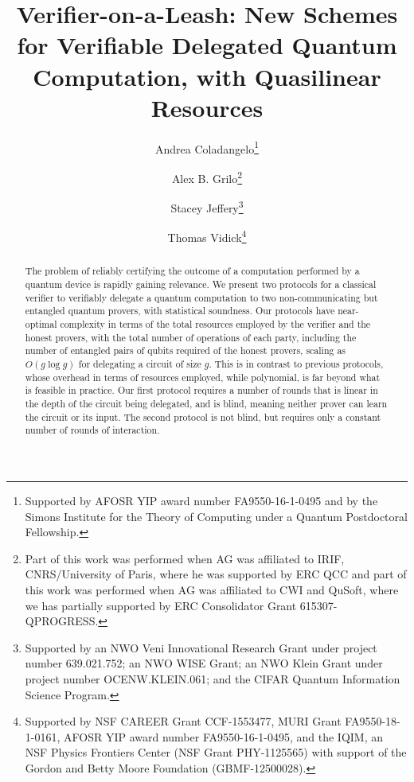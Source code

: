 \documentclass{toc}
\begin{document}
\begin{frontmatter} [classification=text]

\title{Verifier-on-a-Leash: New Schemes for Verifiable Delegated Quantum Computation, with Quasilinear Resources}

\author[coladangelo]{Andrea Coladangelo\thanks{Supported by AFOSR YIP award number FA9550-16-1-0495 and by the Simons Institute for the Theory of Computing under a Quantum Postdoctoral Fellowship.}}
\author[grilo]{Alex B. Grilo\thanks{Part of this work was performed when AG was affiliated to IRIF, CNRS/University of Paris, where he was supported by ERC QCC and part of this work was performed when AG was affiliated to CWI and QuSoft, where we has partially supported by ERC Consolidator Grant 615307-QPROGRESS.}}
\author[jeffery]{Stacey Jeffery\thanks{Supported by an NWO Veni Innovational Research Grant under project number 639.021.752; an NWO WISE Grant; an NWO Klein Grant under project number OCENW.KLEIN.061;
and the CIFAR Quantum Information Science Program.
}}
\author[vidick]{Thomas Vidick\thanks{Supported by NSF CAREER Grant CCF-1553477, MURI Grant FA9550-18-1-0161, AFOSR YIP award number FA9550-16-1-0495, and the IQIM, an NSF Physics Frontiers Center (NSF Grant PHY-1125565) with support of the Gordon and Betty Moore Foundation (GBMF-12500028).%
%
%
%
%
%
%
%
%
%
%
%
%
} 
}  %

\begin{abstract}
The problem of reliably certifying the outcome of a computation performed by a quantum device is rapidly gaining relevance. We present two protocols for a classical verifier to verifiably delegate a quantum computation to two non-communicating but entangled quantum provers, with statistical soundness. Our protocols have near-optimal complexity in terms of the total resources employed by the verifier and the honest provers, with the total number of operations of each party, including the number of entangled pairs of qubits required of the honest provers, scaling as $O(g\log g)$ for delegating a circuit of size $g$. This is in contrast to previous protocols, whose overhead in terms of resources employed, while polynomial, is
far beyond what is feasible in practice. 
Our first protocol requires a number of rounds that is linear in the depth of the circuit being delegated, and is blind, meaning neither prover can learn the circuit or its input. The second protocol is not blind, but requires only a constant number of rounds of interaction. 


\end{abstract}
\end{frontmatter}
\end{document}
